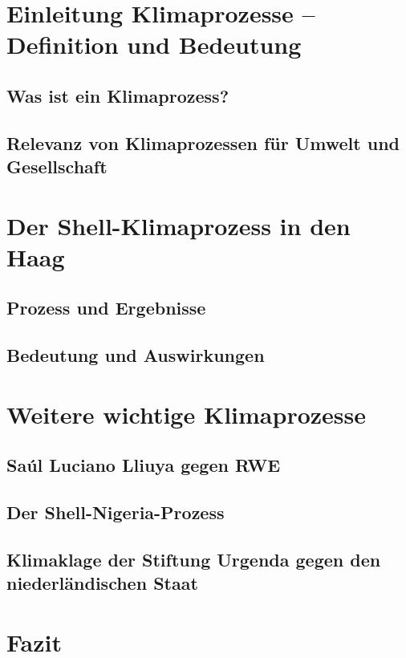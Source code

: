 \documentclass[a4paper, 12pt]{article} %
\begin{document}
\sloppy

\tableofcontents

\clearpage



\section{Einleitung Klimaprozesse – Definition und Bedeutung}
\subsection{Was ist ein Klimaprozess?}
\subsection{Relevanz von Klimaprozessen für Umwelt und Gesellschaft}
\section{Der Shell-Klimaprozess in den Haag}
\subsection{Prozess und Ergebnisse}
\subsection{Bedeutung und Auswirkungen}
\section{Weitere wichtige Klimaprozesse}
\subsection{Saúl Luciano Lliuya gegen RWE}
\subsection{Der Shell-Nigeria-Prozess}
\subsection{Klimaklage der Stiftung Urgenda gegen den niederländischen Staat}
\section{Fazit}
\end{document}
